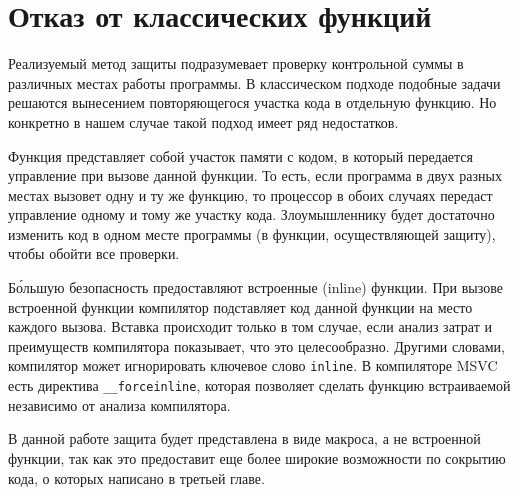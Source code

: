 
\section{Отказ от классических функций}

Реализуемый метод защиты подразумевает проверку контрольной суммы в различных
местах работы программы. В классическом подходе подобные задачи решаются
вынесением повторяющегося участка кода в отдельную функцию. Но конкретно в нашем
случае такой подход имеет ряд недостатков. 

Функция представляет собой участок памяти с кодом, в который передается
управление при вызове данной функции. То есть, если программа в двух разных
местах вызовет одну и ту же функцию, то процессор в обоих случаях передаст
управление одному и тому же участку кода.  Злоумышленнику будет достаточно
изменить код в одном месте программы (в функции, осуществляющей защиту), чтобы
обойти все проверки. 

Б\'{о}льшую безопасность предоставляют встроенные (inline) функции. При вызове
встроенной функции компилятор подставляет код данной функции на место каждого
вызова. Вставка происходит только в том случае, если анализ затрат и преимуществ
компилятора показывает, что это целесообразно. Другими словами, компилятор может
игнорировать ключевое слово \verb!inline!. В компиляторе MSVC есть директива
\verb!__forceinline!, которая позволяет сделать функцию встраиваемой независимо
от анализа компилятора.

В данной работе защита будет представлена в виде макроса, а не встроенной
функции, так как это предоставит еще более широкие возможности по сокрытию кода,
о которых написано в третьей главе.
